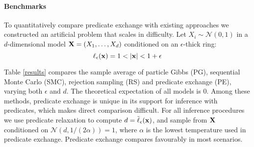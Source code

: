 


\paragraph{Benchmarks}
To quantitatively compare predicate exchange with existing approaches we constructed an artificial problem that scales in difficulty.
Let $X_i \sim \mathcal{N}(0,1)$ in a $d$-dimensional model $\mathbf{X} = (X_1, \dots, X_d)$ conditioned on an $\epsilon$-thick ring:
\begin{equation}
\operatorname{\ell}_\epsilon(\mathbf{x}) = 1 < |\mathbf{x}| < 1 + \epsilon
\end{equation}

Table \ref{results} compares the sample average of particle Gibbs (PG), sequential Monte Carlo (SMC), rejection sampling (RS) and predicate exchange (PE), varying both $\epsilon$ and $d$.
The theoretical expectation of all models is 0.
Among these methods, predicate exchange is unique in its support for inference with predicates, which makes direct comparison difficult.
For all inference procedures we use predicate relaxation to compute $d = \tilde{\operatorname{\ell}}_\epsilon(\mathbf{x})$, and sample from $\mathbf{X}$ conditioned on $\mathcal{N}(d, 1/(2\alpha)) = 1$, where $\alpha$ is the lowest temperature used in predicate exchange.
Predicate exchange  compares favourably in most scenarios.


